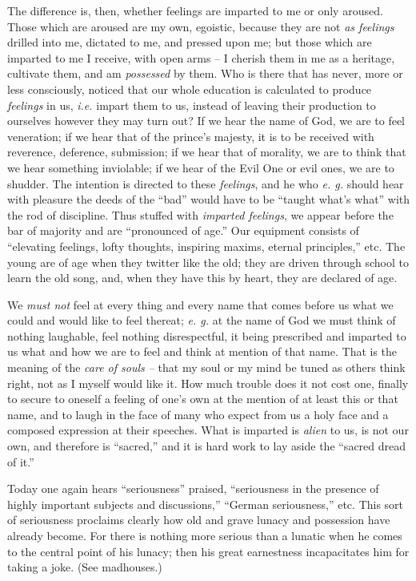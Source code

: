 \documentclass[12pt,a4paper]{book}
\begin{document}
The difference is, then, whether feelings are imparted to me or only aroused. 
Those which are aroused are my own, egoistic, because they are not \textit{as 
feelings} drilled into me, dictated to me, and pressed upon me; but those 
which are imparted to me I receive, with open arms -- I cherish them in me as 
a heritage, cultivate them, and am \textit{possessed} by them. Who is there 
that has never, more or less consciously, noticed that our whole education is 
calculated to produce \textit{feelings} in us, \textit{i.e.} impart them to 
us, instead of leaving their production to ourselves however they may turn 
out? If we hear the name of God, we are to feel veneration; if we hear that of 
the prince's majesty, it is to be received with reverence, deference, 
submission; if we hear that of morality, we are to think that we hear 
something inviolable; if we hear of the Evil One or evil ones, we are to 
shudder. The intention is directed to these \textit{feelings}, and he who 
\textit{e. g.} should hear with pleasure the deeds of the ``bad'' would have 
to be ``taught what's what'' with the rod of discipline. Thus stuffed with 
\textit{imparted feelings}, we appear before the bar of majority and are 
``pronounced of age.'' Our equipment consists of ``elevating feelings, 
lofty thoughts, inspiring maxims, eternal principles,'' etc. The young are of 
age when they twitter like the old; they are driven through school to learn 
the old song, and, when they have this by heart, they are declared of age.

We \textit{must not} feel at every thing and every name that comes before us 
what we could and would like to feel thereat; \textit{e. g.} at the name of 
God we must think of nothing laughable, feel nothing disrespectful, it being 
prescribed and imparted to us what and how we are to feel and think at mention 
of that name. That is the meaning of the \textit{care of souls --} that my 
soul or my mind be tuned as others think right, not as I myself would like it. 
How much trouble does it not cost one, finally to secure to oneself a feeling 
of one's own at the mention of at least this or that name, and to laugh in the 
face of many who expect from us a holy face and a composed expression at their 
speeches. What is imparted is \textit{alien} to us, is not our own, and 
therefore is ``sacred,'' and it is hard work to lay aside the ``sacred 
dread of it.''

Today one again hears ``seriousness'' praised, ``seriousness in the 
presence of highly important subjects and discussions,'' ``German 
seriousness,'' etc. This sort of seriousness proclaims clearly how old and 
grave lunacy and possession have already become. For there is nothing more 
serious than a lunatic when he comes to the central point of his lunacy; then 
his great earnestness incapacitates him for taking a joke. (See madhouses.)
\end{document}
